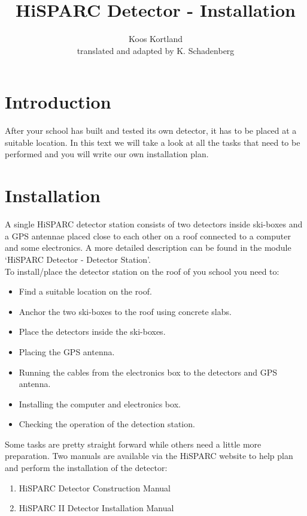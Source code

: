 \documentclass[12pt,a4paper]{article}
\author{Koos Kortland \\ translated and adapted by K. Schadenberg}
\date{}
\title{HiSPARC Detector - Installation}
\numberwithin{equation}{section}
\numberwithin{figure}{section}
\numberwithin{table}{section}
\begin{document}
\maketitle

\section{Introduction}
After your school has built and tested its own detector, it has to be placed at a suitable location. In this text we will take a look at all the tasks that need to be performed and you will write our own installation plan.

\section{Installation}
A single HiSPARC detector station consists of two detectors inside ski-boxes and a GPS antennae placed close to each other on a roof connected to a computer and some electronics. A more detailed description can be found in the module `HiSPARC Detector - Detector Station'.\\

To install/place the detector station on the roof of you school you need to:
\begin{itemize}
\item Find a suitable location on the roof.
\item Anchor the two ski-boxes to the roof using concrete slabs.
\item Place the detectors inside the ski-boxes.
\item Placing the GPS antenna.
\item Running the cables from the electronics box to the detectors and GPS antenna.
\item Installing the computer and electronics box.
\item Checking the operation of the detection station.
\end{itemize}

Some tasks are pretty straight forward while others need a little more preparation. Two manuals are available via the HiSPARC website to help plan and perform the installation of the detector:
\begin{enumerate}[-]
\item HiSPARC Detector Construction Manual
\item HiSPARC II Detector Installation Manual
\end{enumerate}
\end{document}
